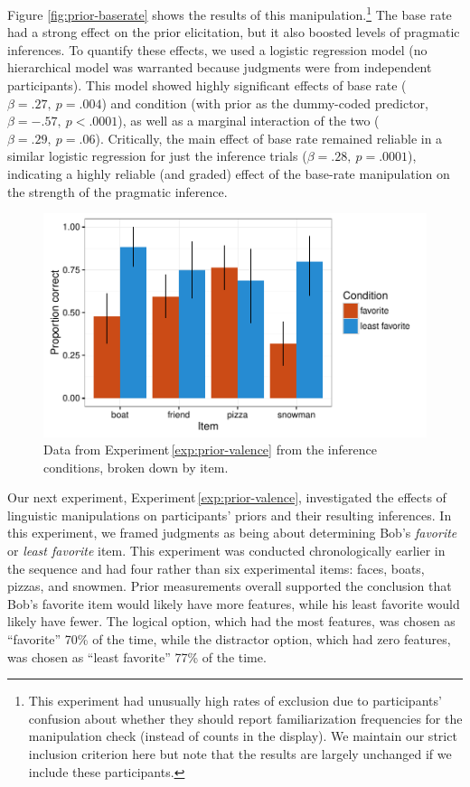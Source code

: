 \documentclass[man,noapacite]{apa2}
\newcounter{Experiment}
\newcommand{\exptref}[1]{Experiment\,\ref{#1}}
\begin{document}
Figure \ref{fig:prior-baserate} shows the results of this manipulation.\footnote{This experiment had unusually high rates of exclusion due to participants' confusion about whether they should report familiarization frequencies for the manipulation check (instead of counts in the display). We maintain our strict inclusion criterion here but note that the results are largely unchanged if we include these participants.}  The base rate had a strong effect on the prior elicitation, but it also boosted levels of pragmatic inferences. To quantify these effects, we used a logistic regression model (no hierarchical model was warranted because judgments were from independent participants). This model showed highly significant effects of base rate ($\beta = .27,~p = .004$) and condition (with prior as the dummy-coded predictor, $\beta = -.57,~p < .0001$), as well as a marginal interaction of the two  ($\beta = .29,~p = .06$). Critically, the main effect of base rate remained reliable in a similar logistic regression for just the inference trials ($\beta = .28,~p = .0001$), indicating a highly reliable (and graded) effect of the base-rate manipulation on the strength of the pragmatic inference.


\begin{figure}[t]
  \centering
  \includegraphics[width=6in]{../plots/2-prior-valence-items.pdf}
  \caption{\label{fig:prior-valence} Data from \exptref{exp:prior-valence} from the inference conditions, broken down by item.}
\end{figure}

Our next experiment, \exptref{exp:prior-valence}, investigated the effects of linguistic manipulations on participants' priors and their resulting inferences. In this experiment, we framed judgments as being about determining Bob's \emph{favorite} or \emph{least favorite} item. This experiment was conducted chronologically earlier in the sequence and had four rather than six experimental items: faces, boats, pizzas, and snowmen. Prior measurements overall supported the conclusion that Bob's favorite item would likely have more features, while his least favorite would likely have fewer. The logical option, which had the most features, was chosen as ``favorite'' 70\% of the time, while the distractor option, which had zero features, was chosen as ``least favorite'' 77\% of the time.
\end{document}
